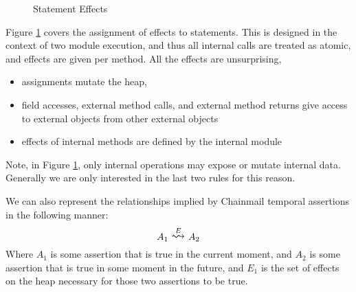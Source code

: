 \documentclass[12pt]{article}
\newcommand\trans[1]{\overset{#1}{\mathlarger{\mathlarger \leadsto}}}
\begin{document}
\begin{figure}[h]
\caption{Statement Effects}
\label{f:effectAssign}
\end{figure}

Figure \ref{f:effectAssign} covers the assignment of effects to statements.
This is designed in the context of two module execution, and thus all
internal calls are treated as atomic, and effects are given per method.
All the effects are unsurprising, 
\begin{itemize}
\item
assignments mutate the heap, 
\item
field accesses, external method calls, and external method returns give access to external objects from other external objects
\item
effects of internal methods are defined by the internal module
\end{itemize}
Note, in Figure \ref{f:effectAssign}, only internal operations may expose or mutate internal data. 
Generally we are only interested in the last two rules for this reason.

We can also represent the relationships implied by Chainmail temporal assertions in the following manner:
$$A_1\ \trans{E}\ A_2$$
Where $A_1$ is some assertion that is true in the current moment, and $A_2$
is some assertion that is true in some moment in the future, and
$E_1$ is the set of effects on the heap necessary for those two assertions to be true.
\end{document}
